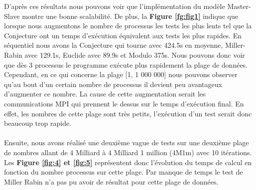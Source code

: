 D'après ces résultats nous pouvons voir que l'implémentation du modèle Master-Slave montre une bonne scalabilité. De plus, la \textbf{Figure \ref{fg:fig1}} indique que lorsque nous augmentons le nombre de processus les tests les plus lents tel que la Conjecture ont un temps d'exécution équivalent aux tests les plus rapides. En séquentiel nous avons la Conjecture qui tourne avec 424.5s en moyenne, Miller-Rabin avec 129.1s, Euclide avec 89.9s et Modulo 375s. Nous pouvons donc voir que dès 3 processus le programme exécute plus rapidement la plage de données.
Cependant, en ce qui concerne la plage [1, 1 000 000] nous pouvons observer qu'au bout d'un certain nombre de processus il devient peu avantageux d'augmenter ce nombre. La cause de cette augmentation serait les communications MPI qui prennent le dessus sur le temps d'exécution final. En effet, les nombres de cette plage sont très petits, l'exécution d'un test serait donc beaucoup trop rapide.\\


	\paragraph{}Ensuite, nous avons réalisé une deuxième vague de tests sur une deuxième plage de nombres allant de 4 Milliard à 4 Milliard 1 million (4M1m) avec 10 itérations. Les \textbf{Figure \ref{fig:4} et \ref{fig:5}} représentent donc l'évolution du temps de calcul en fonction du nombre processus sur cette plage. Par manque de temps le test de Miller Rabin n'a pas pu avoir de résultat pour cette plage de données.

